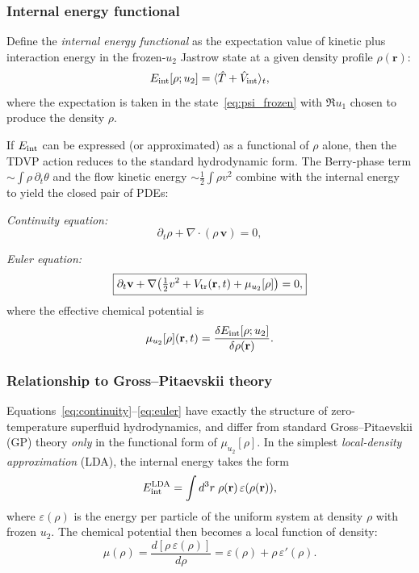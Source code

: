 \documentclass[twocolumn,superscriptaddress,aps,pra,longbibliography]{revtex4-2}
\newcommand{\br}{\mathbf{r}}
\newcommand{\bv}{\mathbf{v}}
\newcommand{\avg}[1]{\langle #1 \rangle}
\begin{document}
\subsubsection{Internal energy functional}

Define the \emph{internal energy functional} as the expectation value of
kinetic plus interaction energy in the frozen-$u_2$ Jastrow state at
a given density profile $\rho(\br)$:
\begin{equation}
E_{\rm int}[\rho; u_2] = \avg{\hat{T} + \hat{V}_{\rm int}}_t,
\label{eq:Eint_functional}
\end{equation}
where the expectation is taken in the state~\eqref{eq:psi_frozen} with
$\Re u_1$ chosen to produce the density $\rho$.

If $E_{\rm int}$ can be expressed (or approximated) as a functional of
$\rho$ alone, then the TDVP action reduces to the standard hydrodynamic
form.  The Berry-phase term $\sim \int\rho\,\partial_t\theta$ and the
flow kinetic energy $\sim\frac{1}{2}\int\rho v^2$ combine with the
internal energy to yield the closed pair of PDEs:

\emph{Continuity equation:}
\begin{equation}
\boxed{
\partial_t\rho + \nabla\!\cdot(\rho\,\bv) = 0,
}
\label{eq:continuity}
\end{equation}

\emph{Euler equation:}
\begin{equation}
\boxed{
\partial_t\bv + \nabla\!\left(\tfrac{1}{2}v^2
+ V_{\rm tr}(\br,t) + \mu_{u_2}[\rho]\right) = 0,
}
\label{eq:euler}
\end{equation}
where the effective chemical potential is
\begin{equation}
\mu_{u_2}[\rho](\br,t) = \frac{\delta E_{\rm int}[\rho;u_2]}
{\delta\rho(\br)}.
\label{eq:mu_functional}
\end{equation}

\subsubsection{Relationship to Gross--Pitaevskii theory}

Equations~\eqref{eq:continuity}--\eqref{eq:euler} have exactly the
structure of zero-temperature superfluid hydrodynamics, and differ from
standard Gross--Pitaevskii (GP) theory \emph{only} in the functional form
of $\mu_{u_2}[\rho]$.  In the simplest \emph{local-density approximation}
(LDA), the internal energy takes the form
\begin{equation}
E_{\rm int}^{\rm LDA} = \int d^3r\;\rho(\br)\,
\varepsilon(\rho(\br)),
\label{eq:Eint_LDA}
\end{equation}
where $\varepsilon(\rho)$ is the energy per particle of the uniform system
at density $\rho$ with frozen $u_2$.  The chemical potential then becomes
a local function of density:
\begin{equation}
\mu(\rho) = \frac{d[\rho\,\varepsilon(\rho)]}{d\rho}
= \varepsilon(\rho) + \rho\,\varepsilon'(\rho).
\label{eq:mu_LDA}
\end{equation}
\end{document}
